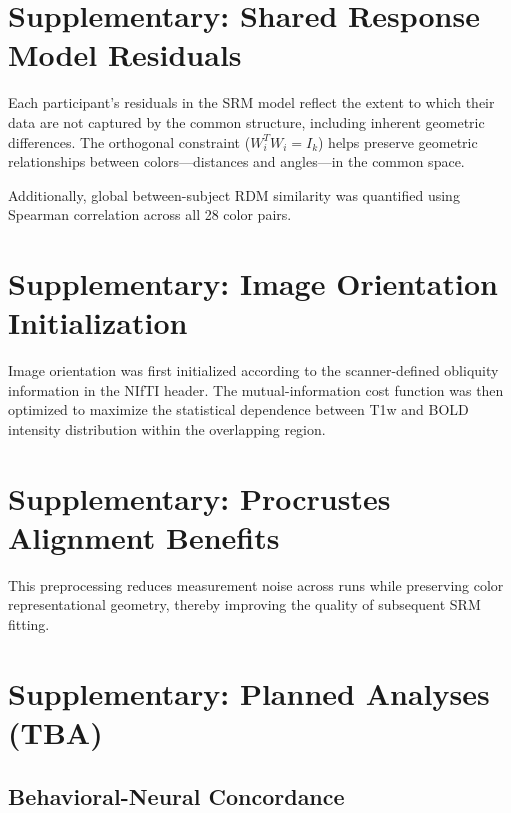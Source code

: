 \documentclass[a4paper,11pt]{article}
\begin{document}
\section*{Supplementary: Shared Response Model Residuals}

Each participant's residuals in the SRM model reflect the extent to which their data are not captured by the common structure, including inherent geometric differences. The orthogonal constraint ($W_i^T W_i = I_k$) helps preserve geometric relationships between colors---distances and angles---in the common space.

Additionally, global between-subject RDM similarity was quantified using Spearman correlation across all 28 color pairs.



\section*{Supplementary: Image Orientation Initialization}

Image orientation was first initialized according to the scanner-defined obliquity information in the NIfTI header. The mutual-information cost function was then optimized to maximize the statistical dependence between T1w and BOLD intensity distribution within the overlapping region.



\section*{Supplementary: Procrustes Alignment Benefits}

This preprocessing reduces measurement noise across runs while preserving color representational geometry, thereby improving the quality of subsequent SRM fitting.



\section*{Supplementary: Planned Analyses (TBA)}

\subsection*{Behavioral-Neural Concordance}
\end{document}
